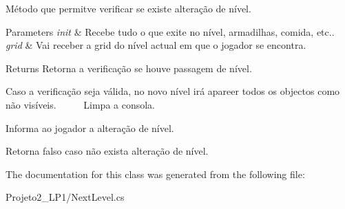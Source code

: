 Método que permitve verificar se existe alteração de nível. 


\begin{DoxyParams}{Parameters}
{\em init} & Recebe tudo o que exite no nível, armadilhas, comida, etc..\\
\hline
{\em grid} & Vai receber a grid do nível actual em que o jogador se encontra.\\
\hline
\end{DoxyParams}
\begin{DoxyReturn}{Returns}
Retorna a verificação se houve passagem de nível.
\end{DoxyReturn}
Caso a verificação seja válida, no novo nível irá apareer todos os objectos como não visíveis. ~\newline
~\newline
~\newline
 Limpa a consola.

Informa ao jogador a alteração de nível.

Retorna falso caso não exista alteração de nível. 

The documentation for this class was generated from the following file\+:\begin{DoxyCompactItemize}
\item 
Projeto2\+\_\+\+L\+P1/Next\+Level.\+cs\end{DoxyCompactItemize}
